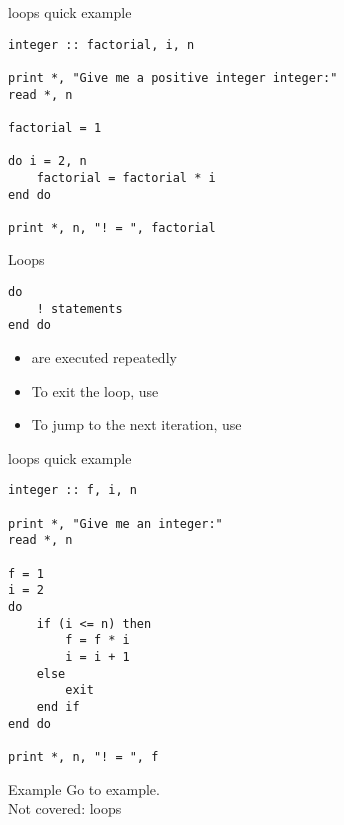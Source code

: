 \begin{frame}[fragile]
  \begin{block}{ loops quick example}\pause
\begin{lstlisting}
integer :: factorial, i, n

print *, "Give me a positive integer integer:"
read *, n

factorial = 1

do i = 2, n
    factorial = factorial * i
end do  

print *, n, "! = ", factorial
\end{lstlisting}
  \end{block}
\end{frame}


\begin{frame}[fragile]
  \begin{block}{ Loops}\pause
\begin{lstlisting}
do
    ! statements
end do
\end{lstlisting}
  \begin{itemize}
    \item {} are executed repeatedly
    \item To exit the loop, use 
    \item To jump to the next iteration, use 
  \end{itemize}
  \end{block}
\end{frame}


\begin{frame}[fragile]
  \begin{block}{ loops quick example}\pause
\begin{lstlisting}
integer :: f, i, n

print *, "Give me an integer:"
read *, n

f = 1
i = 2
do
    if (i <= n) then
        f = f * i
        i = i + 1
    else
        exit
    end if
end do  

print *, n, "! = ", f
\end{lstlisting}
  \end{block}
\end{frame}


\begin{frame}
  \begin{block}{Example}\pause
    Go to example.\\[.4cm]
    Not covered:  loops
  \end{block}
\end{frame}